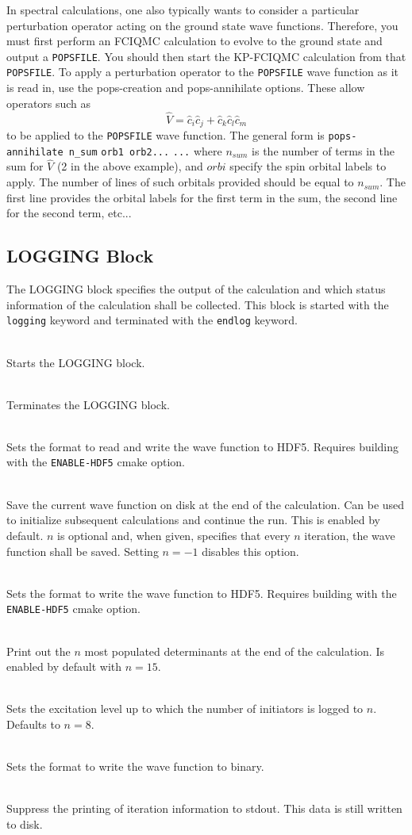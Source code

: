\documentclass[a4paper,notitlepage]{scrreprt}
\newcommand\codeitem[1]{\needspace{1.5\baselineskip}\item[\textnormal{\ttfamily #1 \nopagebreak}] \hfill \\ \nopagebreak}
\let\code\lstinline
\begin{document}
    In spectral calculations, one also typically wants to consider a particular
    perturbation operator acting on the ground state wave functions. Therefore,
    you must first perform an FCIQMC calculation to evolve to the ground state
    and output a \code{POPSFILE}. You should then start the KP-FCIQMC
    calculation from that \code{POPSFILE}. To apply a perturbation operator to
    the \code{POPSFILE} wave function as it is read in, use the pops-creation
    and pops-annihilate options. These allow operators such as
    \begin{equation}
        \hat{V} = \hat{c}_i \hat{c}_j + \hat{c}_k \hat{c}_l \hat{c}_m
    \end{equation}
    to be applied to the \code{POPSFILE} wave function. The general form is
    \code{pops-annihilate n_sum}
    \code{orb1 orb2...}
    \code{...}
    where $n_{sum}$ is the number of terms in the sum for $\hat{V}$ (2 in the
    above example), and $orbi$ specify the spin orbital labels to apply. The
    number of lines of such orbitals provided should be equal to $n_{sum}$. The
    first line provides the orbital labels for the first term in the sum, the
    second line for the second term, etc...

    \subsection{LOGGING Block}
    The LOGGING block specifies the output of the calculation and which
    status information of the calculation shall be collected. This block is
    started with the \texttt{logging} keyword and terminated with the
    \texttt{endlog} keyword.
    \begin{description}
      \codeitem{\textcolor{oblue}{logging}}
      Starts the LOGGING block.
      \codeitem{\textcolor{oblue}{endlog}}
      Terminates the LOGGING block.
      \codeitem{\textcolor{oblue}{hdf5-popsfile}}
      Sets the format to read and write the wave function to HDF5. Requires building
      with the \texttt{ENABLE-HDF5} cmake option.
      \codeitem{popsfile $n$}
      Save the current wave function on disk at the end of the
      calculation. Can be used to initialize subsequent calculations and
      continue the run. This is enabled by default. $n$ is optional and, when
      given, specifies that every $n$ iteration, the wave function shall be
      saved. Setting $n=-1$ disables this option.
      \codeitem{hdf5-pops-write}
      Sets the format to write the wave function to HDF5. Requires building
      with the \texttt{ENABLE-HDF5} cmake option.      
      \codeitem{highlyPopWrite $n$}
      Print out the $n$ most populated determinants at the end of the
      calculation. Is enabled by default with $n=15$.
      \codeitem{inits-exlvl-write $n$}
      Sets the excitation level up to which the number of initiators is logged
      to $n$. Defaults to $n=8$.
      \codeitem{binarypops}
      Sets the format to write the wave function to binary.
      \codeitem{nomcoutput}
      Suppress the printing of iteration information to stdout. This data is
      still written to disk.
    \end{description}
\end{document}
